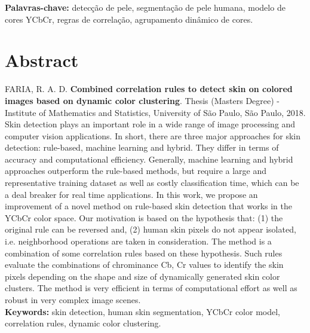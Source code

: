 \documentclass[11pt,twoside,a4paper]{book}
\theoremstyle{plain}
\theoremstyle{definition}
\begin{document}
\noindent \textbf{Palavras-chave:} detecção de pele, segmentação de pele humana, modelo de cores YCbCr, regras de correlação, agrupamento dinâmico de cores.

\chapter*{Abstract}
\noindent FARIA, R. A. D. \textbf{Combined correlation rules to detect skin on colored images based on dynamic color clustering}.
Thesis (Masters Degree) - Institute of Mathematics and Statistics,
University of São Paulo, São Paulo, 2018.
\\

Skin detection plays an important role in a wide range of image processing and computer vision applications. In short, there are three major approaches for skin detection: rule-based, machine learning and hybrid. They differ in terms of accuracy and computational efficiency. Generally, machine learning and hybrid approaches outperform the rule-based methods, but require a large and representative training dataset as well as costly classification time, which can be a deal breaker for real time applications. In this work, we propose an improvement of a novel method on rule-based skin detection that works in the YCbCr color space. Our motivation is based on the hypothesis that: (1) the original rule can be reversed and, (2) human skin pixels do not appear isolated, i.e. neighborhood operations are taken in consideration. The method is a combination of some correlation rules based on these hypothesis. Such rules evaluate the combinations of chrominance Cb, Cr values to identify the skin pixels depending on the shape and size of dynamically generated skin color clusters. The method is very efficient in terms of computational effort as well as robust in very complex image scenes.
\\

\noindent \textbf{Keywords:} skin detection, human skin segmentation, YCbCr color model, correlation rules, dynamic color clustering.

\tableofcontents    %

\end{document}
